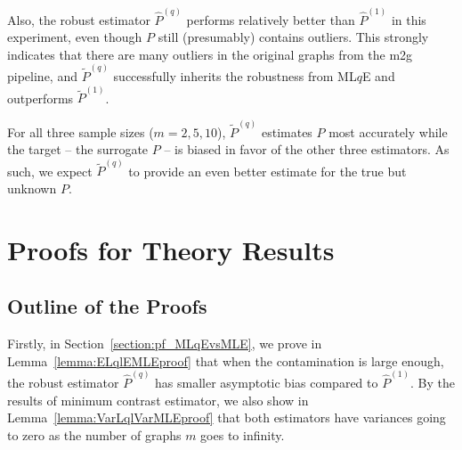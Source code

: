 Also, the robust estimator $\hat{P}^{(q)}$ performs relatively better than $\hat{P}^{(1)}$ in this experiment, even though $P$ still (presumably) contains outliers. This strongly indicates that there are many outliers in the original graphs from the m2g pipeline, and $\widetilde{P}^{(q)}$ successfully inherits the robustness from ML$q$E and outperforms $\widetilde{P}^{(1)}$.

For all three sample sizes ($m = 2, 5, 10$), $\widetilde{P}^{(q)}$ estimates $P$ most accurately while the target -- the surrogate $P$ -- is biased in favor of the other three estimators. As such, we expect $\widetilde{P}^{(q)}$ to provide an even better estimate for the true but unknown $P$.








\section{Proofs for Theory Results}
\label{sec:robust_LLG_proof}

\subsection{Outline of the Proofs}

Firstly, in Section~\ref{section:pf_MLqEvsMLE}, we prove in Lemma~\ref{lemma:ELqlEMLEproof} that when the contamination is large enough, the robust estimator $\hat{P}^{(q)}$ has smaller asymptotic bias compared to $\hat{P}^{(1)}$. By the results of minimum contrast estimator, we also show in Lemma~\ref{lemma:VarLqlVarMLEproof} that both estimators have variances going to zero as the number of graphs $m$ goes to infinity.

